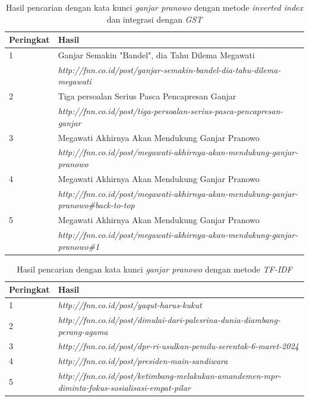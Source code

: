 \begin{table}[H]
\begin{center}
  \caption{\label{tabel:hasil_gst_ganjar} Hasil pencarian dengan kata kunci
  \textit{ganjar pranowo} dengan metode \textit{inverted index} dan integrasi dengan
  \textit{GST}}
  \begin{tabular}{|p{0.7in}|p{4.5in}|} 
 \hline
  Peringkat & Hasil \\ 
 \hline
  1 & Ganjar Semakin "Bandel", dia Tahu Dilema Megawati \\ 
   & \textit{http://fnn.co.id/post/ganjar-semakin-bandel-dia-tahu-dilema-megawati} \\
 \hline
  2 & Tiga persoalan Serius Pasca Pencapresan Ganjar \\ 
   & \textit{http://fnn.co.id/post/tiga-persoalan-serius-pasca-pencapresan-ganjar} \\
 \hline
  3 & Megawati Akhirnya Akan Mendukung Ganjar Pranowo \\ 
   & \textit{http://fnn.co.id/post/megawati-akhirnya-akan-mendukung-ganjar-pranowo} \\
 \hline
  4 & Megawati Akhirnya Akan Mendukung Ganjar Pranowo \\ 
   & \textit{http://fnn.co.id/post/megawati-akhirnya-akan-mendukung-ganjar-pranowo\#back-to-top} \\
 \hline
  5 & Megawati Akhirnya Akan Mendukung Ganjar Pranowo \\ 
   & \textit{http://fnn.co.id/post/megawati-akhirnya-akan-mendukung-ganjar-pranowo\#1} \\
 \hline
\end{tabular}
\end{center}
\end{table}

\begin{table}[H]
\begin{center}
  \caption{\label{tabel:hasil_tfidf_ganjar} Hasil pencarian dengan kata kunci
  \textit{ganjar pranowo} dengan metode \textit{TF-IDF}}
  \begin{tabular}{|p{0.7in}|p{4.5in}|} 
 \hline
  Peringkat & Hasil \\ 
 \hline
    1 & \textit{http://fnn.co.id/post/yaqut-harus-kukut} \\ 
 \hline
    2 & \textit{http://fnn.co.id/post/dimulai-dari-palesrina-dunia-diambang-perang-agama} \\
 \hline
    3 & \textit{http://fnn.co.id/post/dpr-ri-usulkan-pemilu-serentak-6-maret-2024} \\
 \hline
    4 & \textit{http://fnn.co.id/post/presiden-main-sandiwara} \\
 \hline
    5 & \textit{http://fnn.co.id/post/ketimbang-melakukan-amandemen-mpr-diminta-fokus-sosialisasi-empat-pilar} \\
 \hline
\end{tabular}
\end{center}
\end{table}

